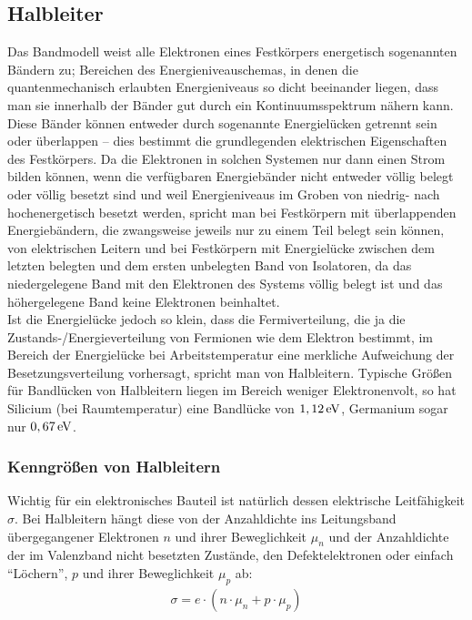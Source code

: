 \documentclass[numbers=noenddot,12pt,a4paper]{scrartcl}
\begin{document}
\subsection{Halbleiter}
Das Bandmodell weist alle Elektronen eines Festkörpers energetisch sogenannten Bändern zu; Bereichen des Energieniveauschemas, in denen die quantenmechanisch erlaubten Energieniveaus so dicht beeinander liegen, dass man sie innerhalb der Bänder gut durch ein Kontinuumsspektrum nähern kann. Diese Bänder können entweder durch sogenannte Energielücken getrennt sein oder überlappen -- dies bestimmt die grundlegenden elektrischen Eigenschaften des Festkörpers. Da die Elektronen in solchen Systemen nur dann einen Strom bilden können, wenn die verfügbaren Energiebänder nicht entweder völlig belegt oder völlig besetzt sind und weil Energieniveaus im Groben von niedrig- nach hochenergetisch besetzt werden, spricht man bei Festkörpern mit überlappenden Energiebändern, die zwangsweise jeweils nur zu einem Teil belegt sein können, von elektrischen Leitern und bei Festkörpern mit Energielücke zwischen dem letzten belegten und dem ersten unbelegten Band von Isolatoren, da das niedergelegene Band mit den Elektronen des Systems völlig belegt ist und das höhergelegene Band keine Elektronen beinhaltet.\\
Ist die Energielücke jedoch so klein, dass die Fermiverteilung, die ja die Zustands-/Energie\-verteilung von Fermionen wie dem Elektron bestimmt, im Bereich der Energielücke bei Arbeitstemperatur eine merkliche Aufweichung der Besetzungsverteilung vorhersagt, spricht man von Halbleitern. Typische Größen für Bandlücken von Halbleitern liegen im Bereich weniger Elektronenvolt, so hat Silicium (bei Raumtemperatur) eine Bandlücke von $\unit[1,12]{eV}$, Germanium sogar nur $\unit[0,67]{eV}$.
\subsubsection{Kenngrößen von Halbleitern}
Wichtig für ein elektronisches Bauteil ist natürlich dessen elektrische Leitfähigkeit $\sigma$. Bei Halbleitern hängt diese von der Anzahldichte ins Leitungsband übergegangener Elektronen $n$ und ihrer Beweglichkeit $\mu_n$ und der Anzahldichte der im Valenzband nicht besetzten Zustände, den Defektelektronen oder einfach "`Löchern"', $p$ und ihrer Beweglichkeit $\mu_p$ ab:
\begin{align}
\sigma=e\cdot\left(n\cdot\mu_n+p\cdot\mu_p\right)
\end{align}
\end{document}

